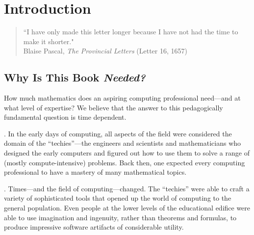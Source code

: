 
\chapter{Introduction}
\label{ch:intro}

\begin{quote}
``I have only made this letter longer because I have not had the time to make it shorter."  \\
\hspace*{1.5in}Blaise Pascal, {\it The Provincial Letters} (Letter 16, 1657)
\end{quote}


\section{Why Is This Book {\em Needed?}}
\label{sec:bookneeded}

How much mathematics does an aspiring computing professional need---and at what level of expertise?  We believe that the answer to this pedagogically fundamental question is time dependent.

\medskip

.
In the early days of computing, all aspects of the field were considered the domain of the ``techies''---the engineers and scientists and mathematicians who designed the early computers and figured out how to use them to solve a range of (mostly compute-intensive) problems.  Back then, one expected every computing professional to have a mastery of many mathematical topics.

\medskip

.
Times---and the field of computing---changed.  The ``techies'' were able to craft a variety of sophisticated tools that opened up the world of computing to the general population.  Even people at the lower levels of the educational edifice were able to use imagination and ingenuity, rather than theorems and formulas, to produce impressive software artifacts of considerable utility.

\medskip

